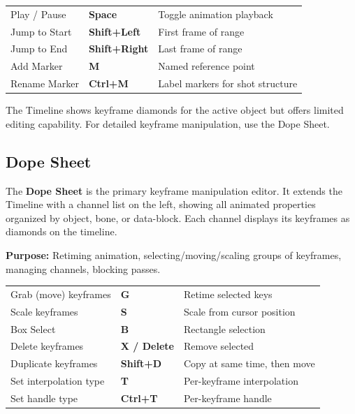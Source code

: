 \begin{shortcutbox}
\begin{center}
\begin{tabularx}{\textwidth}{L{5cm}C{3.5cm}X}
\toprule
{}
 &  &  \\
\midrule
Play / Pause & \textbf{Space} & Toggle animation playback \\
Jump to Start & \textbf{Shift+Left} & First frame of range \\
Jump to End & \textbf{Shift+Right} & Last frame of range \\
Add Marker & \textbf{M} & Named reference point \\
Rename Marker & \textbf{Ctrl+M} & Label markers for shot structure \\
\bottomrule
\end{tabularx}
\end{center}
\end{shortcutbox}

The Timeline shows keyframe diamonds for the active object but offers limited editing capability. For detailed keyframe manipulation, use the Dope Sheet.

\subsection{Dope Sheet}
\label{subsec:dope-sheet}

The \textbf{Dope Sheet} is the primary keyframe manipulation editor. It extends the Timeline with a channel list on the left, showing all animated properties organized by object, bone, or data-block. Each channel displays its keyframes as diamonds on the timeline.

\textbf{Purpose:} Retiming animation, selecting/moving/scaling groups of keyframes, managing channels, blocking passes.

\begin{shortcutbox}
\begin{center}
\begin{tabularx}{\textwidth}{L{5cm}C{3.5cm}X}
\toprule
{}
 &  &  \\
\midrule
Grab (move) keyframes & \textbf{G} & Retime selected keys \\
Scale keyframes & \textbf{S} & Scale from cursor position \\
Box Select & \textbf{B} & Rectangle selection \\
Delete keyframes & \textbf{X / Delete} & Remove selected \\
Duplicate keyframes & \textbf{Shift+D} & Copy at same time, then move \\
Set interpolation type & \textbf{T} & Per-keyframe interpolation \\
Set handle type & \textbf{Ctrl+T} & Per-keyframe handle \\
\bottomrule
\end{tabularx}
\end{center}
\end{shortcutbox}

